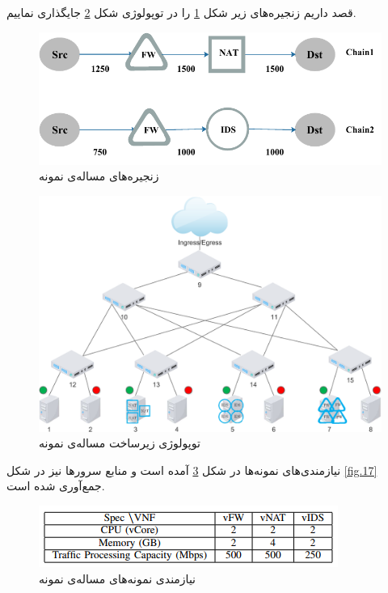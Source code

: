 قصد داریم زنجیره‌های زیر شکل \ref{fig.14} را در توپولوژی شکل \ref{fig.15} جایگذاری نماییم.


\begin{figure}[h]
\center\includegraphics[scale=1]{images/example-chains.pdf}
\caption{زنجیره‌های مساله‌ی نمونه}
\label{fig.14}
\end{figure}


\begin{figure}[h]
\center\includegraphics[scale=.75]{images/example-topology.pdf}
\caption{توپولوژی زیرساخت مساله‌ی نمونه}
\label{fig.15}
\end{figure}

نیازمندی‌های نمونه‌ها در شکل \ref{fig.16} آمده است و منابع سرور‌ها نیز در شکل \ref{fig.17} جمع‌آوری شده است.


\begin{figure}[h]
\center\includegraphics[scale=1]{images/example-types}
\caption{نیازمندی نمونه‌های مساله‌ی نمونه}
\label{fig.16}
\end{figure}

